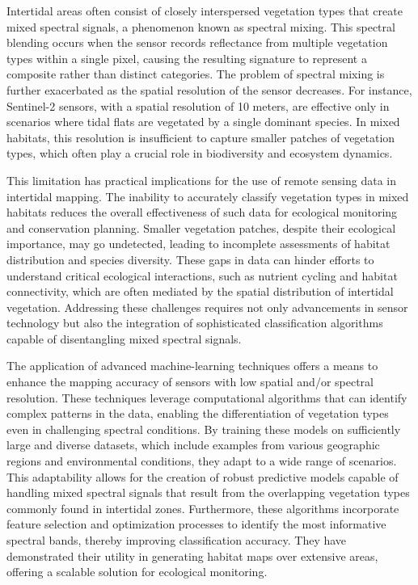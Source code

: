 \documentclass[
  letterpaper,
  11pt,
  english,
  singlespacing,
  headsepline]{MastersDoctoralThesis}
\begin{document}
\begin{spacing}{1.5}
Intertidal areas often consist of closely interspersed vegetation types
that create mixed spectral signals, a phenomenon known as spectral
mixing. This spectral blending occurs when the sensor records
reflectance from multiple vegetation types within a single pixel,
causing the resulting signature to represent a composite rather than
distinct categories. The problem of spectral mixing is further
exacerbated as the spatial resolution of the sensor decreases. For
instance, Sentinel-2 sensors, with a spatial resolution of 10 meters,
are effective only in scenarios where tidal flats are vegetated by a
single dominant species. In mixed habitats, this resolution is
insufficient to capture smaller patches of vegetation types, which often
play a crucial role in biodiversity and ecosystem dynamics.

This limitation has practical implications for the use of remote sensing
data in intertidal mapping. The inability to accurately classify
vegetation types in mixed habitats reduces the overall effectiveness of
such data for ecological monitoring and conservation planning. Smaller
vegetation patches, despite their ecological importance, may go
undetected, leading to incomplete assessments of habitat distribution
and species diversity. These gaps in data can hinder efforts to
understand critical ecological interactions, such as nutrient cycling
and habitat connectivity, which are often mediated by the spatial
distribution of intertidal vegetation. Addressing these challenges
requires not only advancements in sensor technology but also the
integration of sophisticated classification algorithms capable of
disentangling mixed spectral signals.

The application of advanced machine-learning techniques offers a means
to enhance the mapping accuracy of sensors with low spatial and/or
spectral resolution. These techniques leverage computational algorithms
that can identify complex patterns in the data, enabling the
differentiation of vegetation types even in challenging spectral
conditions. By training these models on sufficiently large and diverse
datasets, which include examples from various geographic regions and
environmental conditions, they adapt to a wide range of scenarios. This
adaptability allows for the creation of robust predictive models capable
of handling mixed spectral signals that result from the overlapping
vegetation types commonly found in intertidal zones. Furthermore, these
algorithms incorporate feature selection and optimization processes to
identify the most informative spectral bands, thereby improving
classification accuracy. They have demonstrated their utility in
generating habitat maps over extensive areas, offering a scalable
solution for ecological monitoring.


\end{spacing}
\end{document}
